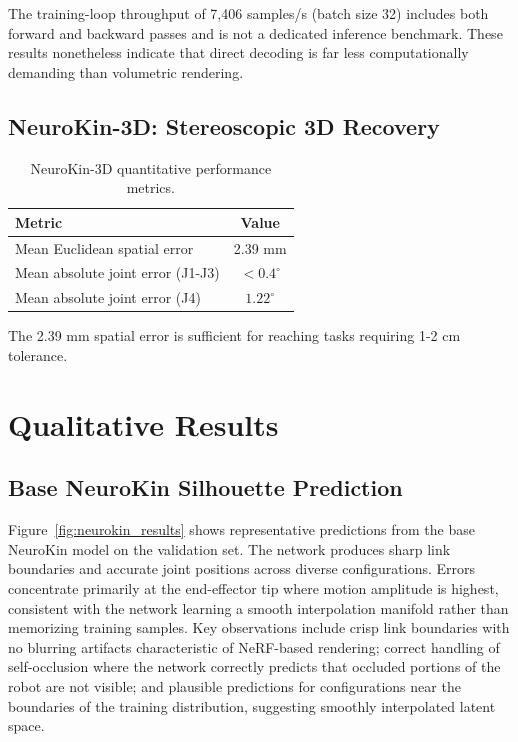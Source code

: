 \documentclass[12pt,a4paper,oneside]{report}
\begin{document}
The training-loop throughput of 7,406 samples/s (batch size 32) includes both forward and backward passes and is not a dedicated inference benchmark. These results nonetheless indicate that direct decoding is far less computationally demanding than volumetric rendering.

\subsection{NeuroKin-3D: Stereoscopic 3D Recovery}

\begin{table}[H]
\centering
\caption{NeuroKin-3D quantitative performance metrics.}
\label{tab:neurokin3d_performance}
\begin{tabular}{lc}
\toprule
Metric & Value \\
\midrule
Mean Euclidean spatial error & 2.39 mm \\
Mean absolute joint error (J1-J3) & $<0.4^\circ$ \\
Mean absolute joint error (J4) & $1.22^\circ$ \\
\bottomrule
\end{tabular}
\end{table}

The 2.39 mm spatial error is sufficient for reaching tasks requiring 1-2 cm tolerance.

\section{Qualitative Results}

\subsection{Base NeuroKin Silhouette Prediction}
\label{subsec:base_neurokin_silhouette_prediction}

Figure~\ref{fig:neurokin_results} shows representative predictions from the base NeuroKin model on the validation set. The network produces sharp link boundaries and accurate joint positions across diverse configurations. Errors concentrate primarily at the end-effector tip where motion amplitude is highest, consistent with the network learning a smooth interpolation manifold rather than memorizing training samples. Key observations include crisp link boundaries with no blurring artifacts characteristic of NeRF-based rendering; correct handling of self-occlusion where the network correctly predicts that occluded portions of the robot are not visible; and plausible predictions for configurations near the boundaries of the training distribution, suggesting smoothly interpolated latent space.
\end{document}
